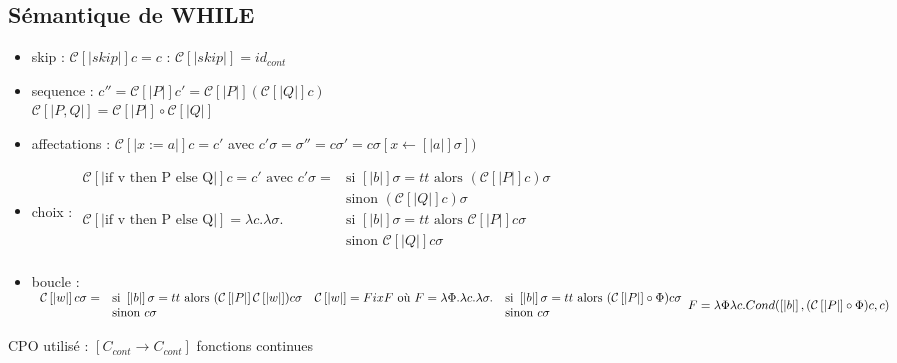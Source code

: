 \documentclass[10pt,a4paper]{article}
\newcommand{\semm}[1]{\left[| #1 | \right]}
\begin{document}
\subsection{Sémantique de WHILE}

\begin{itemize}
 \item skip : $\mathcal{C}\semm{skip} c = c$ : $\mathcal{C}\semm{skip} = id_{cont}$\\
 \item sequence : $c'' = \mathcal{C}\semm{P} c' = \mathcal{C}\semm{P}(\mathcal{C}\semm{Q} c)$\\
		  $\mathcal{C}\semm{P, Q} = \mathcal{C}\semm{P} \circ \mathcal{C}\semm{Q}$\\
 \item affectations :  $\mathcal{C}\semm{x:=a} c = c'$ avec $c' \sigma = \sigma'' = c \sigma' = c \sigma[x \leftarrow \semm{a} \sigma])$\\
 \item choix : 
$\begin{array}{ll}
\mathcal{C}\semm{\text{if v then P else Q}} c = c'\text{ avec }c' \sigma =&\text{si }\semm{b} \sigma = tt \text{ alors } (\mathcal{C}\semm{P} c) \sigma \\
 &\text{sinon } (\mathcal{C}\semm{Q} c) \sigma\\
   \mathcal{C}\semm{\text{if v then P else Q}} = \lambda c. \lambda \sigma. &\text{si } \semm{b} \sigma = tt\text{ alors } \mathcal{C}\semm{P} c \sigma  \\
 &\text{sinon } \mathcal{C}\semm{Q} c \sigma\\
\end{array}$
 \item boucle : \\$
\begin{array}{ll}
 \mathcal{C}\semm{w} c \sigma = &\text{si } \semm{b} \sigma = tt \text{ alors } (\mathcal{C}\semm{P} \mathcal{C}\semm{w}) c \sigma \\
  &\text{sinon } c \sigma\\
\end{array}\\
\begin{array}{ll}
 \mathcal{C}\semm{w} = Fix F \text{ où } F = \lambda \Phi .  \lambda c. \lambda \sigma. &\text{si } \semm{b} \sigma = tt \text{ alors } (\mathcal{C}\semm{P} \circ \Phi) c \sigma \\
&\text{sinon } c \sigma\\ 
\end{array}\\
F = \lambda \Phi \lambda c . Cond ( \semm{b},  (\mathcal{C}\semm{P} \circ \Phi) c, c)\\
$
\end{itemize}
CPO utilisé : $[C_{cont} \to C_{cont}]$ fonctions continues
\end{document}
